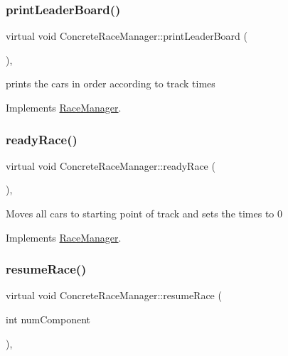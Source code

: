 \subsubsection{\texorpdfstring{print\+Leader\+Board()}{printLeaderBoard()}}
{\footnotesize\ttfamily virtual void Concrete\+Race\+Manager\+::print\+Leader\+Board (\begin{DoxyParamCaption}{ }\end{DoxyParamCaption})\hspace{0.3cm}{\ttfamily [inline]}, {\ttfamily [virtual]}}

prints the cars in order according to track times 

Implements \mbox{\hyperlink{class_race_manager_a2150e315365566150ce687020adc772f}{Race\+Manager}}.

\mbox{\label{class_concrete_race_manager_a52c31abcc79c666388c3c9dd8e285c88}} 
\subsubsection{\texorpdfstring{ready\+Race()}{readyRace()}}
{\footnotesize\ttfamily virtual void Concrete\+Race\+Manager\+::ready\+Race (\begin{DoxyParamCaption}{ }\end{DoxyParamCaption})\hspace{0.3cm}{\ttfamily [inline]}, {\ttfamily [virtual]}}

Moves all cars to starting point of track and sets the times to 0 

Implements \mbox{\hyperlink{class_race_manager_aadeaeec5eaf2d1d8d0178b9fe06116cb}{Race\+Manager}}.

\mbox{\label{class_concrete_race_manager_ad57259cf0ed2055a029fe66dc5d298e1}} 
\subsubsection{\texorpdfstring{resume\+Race()}{resumeRace()}}
{\footnotesize\ttfamily virtual void Concrete\+Race\+Manager\+::resume\+Race (\begin{DoxyParamCaption}\item[{int}]{num\+Component }\end{DoxyParamCaption})\hspace{0.3cm}{\ttfamily [inline]}, {\ttfamily [virtual]}}

